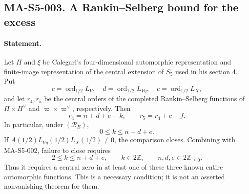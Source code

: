 \subsection*{MA-S5-003. A Rankin--Selberg bound for the excess}

\paragraph{Statement.}
Let $\Pi$ and $\xi$ be Calegari's four-dimensional automorphic
representation and finite-image representation of the central
extension of $S_5$ used in his section 4. Put
\[
 c=\operatorname{ord}_{1/2}L_V,\quad
 d=\operatorname{ord}_{1/2}L_{V\eta},\quad
 e=\operatorname{ord}_{1/2}L_X,
\]
and let $r_4,r_5$ be the central orders of the completed
Rankin--Selberg functions of $\Pi\times\Pi^\vee$ and
$\varpi\times\varpi^\vee$, respectively. Then
\[
 r_4=n+d+e-k,\qquad
 r_5=r_4+c+f.
 \tag{MA-S5.5}
\]
In particular, under $(\mathcal R_B)$,
\[
     0\le k\le n+d+e.
 \tag{MA-S5.6}
\]
If $A(1/2)L_{V\eta}(1/2)L_X(1/2)\ne0$, the comparison closes.
Combining with MA-S5-002, failure to close requires
\[
 2\le k\le n+d+e,\qquad k\in2\mathbb Z,
 \qquad n,d,e\in2\mathbb Z_{\ge0}.
 \tag{MA-S5.7}
\]
Thus it requires a central zero in at least one of these three
known entire automorphic functions. This is a necessary condition;
it is not an asserted nonvanishing theorem for them.


